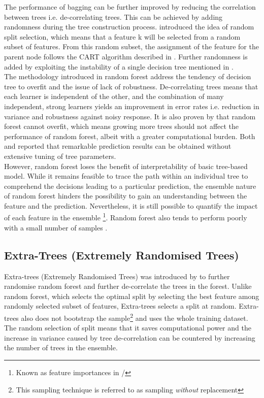 The performance of bagging can be further improved by reducing the correlation between trees i.e. de-correlating trees. This can be achieved by adding randomness during the tree construction process.  introduced the idea of random split selection, which means that a feature k will be selected from a random subset of features. From this random subset, the assignment of the feature for the parent node follows the CART algorithm described in . Further randomness is added by exploiting the instability of a single decision tree mentioned in .\\

The methodology introduced in random forest address the tendency of decision tree to overfit and the issue of lack of robustness. De-correlating trees means that each learner is independent of the other, and the combination of many independent, strong learners yields an improvement in error rates i.e. reduction in variance and robustness against noisy response. It is also proven by  that random forest cannot overfit, which means growing more trees should not affect the performance of random forest, albeit with a greater computational burden. Both  and  reported that remarkable prediction results can be obtained without extensive tuning of tree parameters. \\

However, random forest loses the benefit of interpretability of basic tree-based model. While it remains feasible to trace the path within an individual tree to comprehend the decisions leading to a particular prediction, the ensemble nature of random forest hinders the possibility to gain an understanding between the feature and the prediction. Nevertheless, it is still possible to quantify the impact of each feature in the ensemble \footnote{Known as feature importances in \scikit/}. Random forest also tends to perform poorly with a small number of samples .\\

\subsection{Extra-Trees (Extremely Randomised Trees)}\label{sec:et_theo}

Extra-trees (Extremely Randomised Trees) was introduced by  to further randomise random forest and further de-correlate the trees in the forest. Unlike random forest, which selects the optimal split by selecting the best feature among randomly selected subset of features, Extra-trees selects a split at random. Extra-trees also does not bootstrap the sample\footnote{This sampling technique is referred to as sampling \emph{without} replacement} and uses the whole training dataset. The random selection of split means that it saves computational power and the increase in variance caused by tree de-correlation can be countered by increasing the number of trees in the ensemble.\\ 

